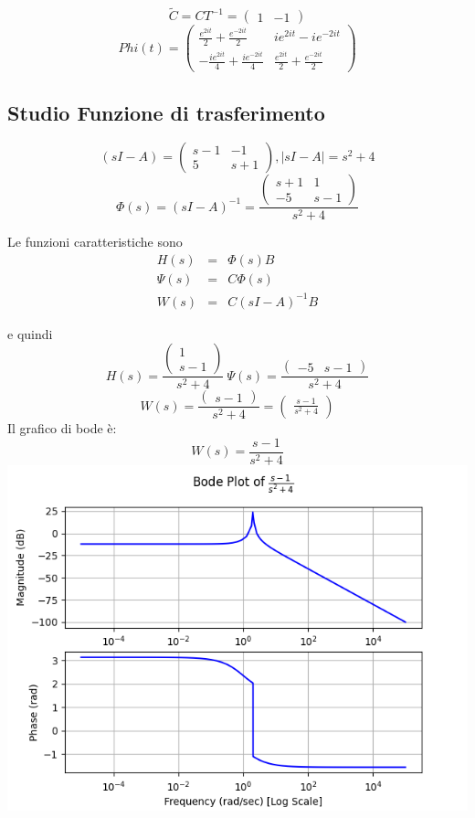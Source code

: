 \documentclass{article}
\begin{document}
\[ \widetilde{C} = C T^{-1} = \left(\begin{matrix}1 & -1\end{matrix}\right) \]
\[Phi(t) = \left(\begin{matrix}\frac{e^{2 i t}}{2} + \frac{e^{- 2 i t}}{2} & i e^{2 i t} - i e^{- 2 i t}\\- \frac{i e^{2 i t}}{4} + \frac{i e^{- 2 i t}}{4} & \frac{e^{2 i t}}{2} + \frac{e^{- 2 i t}}{2}\end{matrix}\right) \]

\subsection{Studio Funzione di trasferimento}

\[ (sI-A) = \left(\begin{matrix}s - 1 & -1\\5 & s + 1\end{matrix}\right), |sI-A| = s^{2} + 4 \]
\[ \Phi(s) = (sI-A)^{-1} = \frac{\left(\begin{matrix}s + 1 & 1\\-5 & s - 1\end{matrix}\right)}{s^{2} + 4} \]

Le funzioni caratteristiche sono \[\begin{array}{rcl}  H(s) & = & \Phi(s)B \\ \Psi(s) & = & C \Phi(s)\\ W(s) & = & C(sI-A)^{-1}B  \end{array} \]

e quindi \[ H(s)  =  \frac{\left(\begin{matrix}1\\s - 1\end{matrix}\right)}{s^{2} + 4} \ \Psi(s) = \frac{\left(\begin{matrix}-5 & s - 1\end{matrix}\right)}{s^{2} + 4} \]
\[ W(s)  =  \frac{\left(\begin{matrix}s - 1\end{matrix}\right)}{s^{2} + 4} = \left(\begin{matrix}\frac{s - 1}{s^{2} + 4}\end{matrix}\right)  \] 
Il grafico di bode è:
\[ W(s) = \frac{s - 1}{s^{2} + 4} \]\includegraphics[scale = 0.5]{figures/bode_1072908.png}
\end{document}
